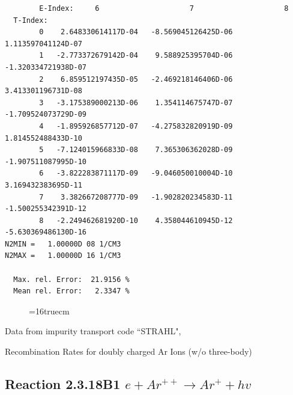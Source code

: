 \documentclass[12pt,dvipdfmx]{article}
\begin{document}
\begin{small}
\begin{verbatim}
        E-Index:     6                     7                     8
  T-Index:
        0    2.648330614117D-04   -8.569045126425D-06    1.113597041124D-07
        1   -2.773372679142D-04    9.588925395704D-06   -1.320334721938D-07
        2    6.859512197435D-05   -2.469218146406D-06    3.413301196731D-08
        3   -3.175389000213D-06    1.354114675747D-07   -1.709524073729D-09
        4   -1.895926857712D-07   -4.275832820919D-09    1.814552488433D-10
        5   -7.124015966833D-08    7.365306362028D-09   -1.907511087995D-10
        6   -3.822283871117D-09   -9.046050010004D-10    3.169432383695D-11
        7    3.382667208777D-09   -1.902820234583D-11   -1.500255342391D-12
        8   -2.249462681920D-10    4.358044610945D-12   -5.630369486130D-16
N2MIN =   1.00000D 08 1/CM3
N2MAX =   1.00000D 16 1/CM3

  Max. rel. Error:  21.9156 %
  Mean rel. Error:   2.3347 %

\end{verbatim}\end{small}
\begin{figure} \label{2.3.18B0}
\epsfxsize=16truecm
\end{figure}
\newpage
Data from impurity transport code ``STRAHL", \cite{kn:Behringer}

  Recombination Rates for doubly charged Ar Ions (w/o three-body)
\subsection{
Reaction 2.3.18B1   $  e + Ar^{++} \rightarrow  Ar^+ + hv$
}
\end{document}
